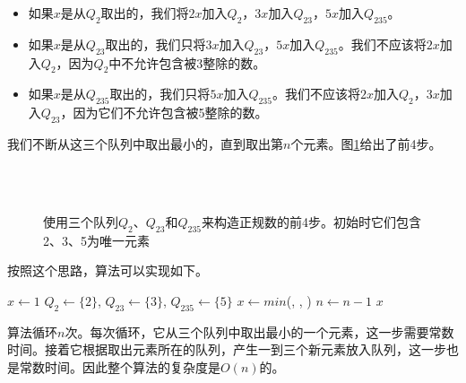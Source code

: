 \documentclass[b5paper]{ctexart}
\begin{document}
\begin{itemize}
\item 如果$x$是从$Q_2$取出的，我们将$2x$加入$Q_2$，$3x$加入$Q_{23}$，$5x$加入$Q_{235}$。
\item 如果$x$是从$Q_{23}$取出的，我们只将$3x$加入$Q_{23}$，$5x$加入$Q_{235}$。我们不应该将$2x$加入$Q_2$，因为$Q_2$中不允许包含被3整除的数。
\item 如果$x$是从$Q_{235}$取出的，我们只将$5x$加入$Q_{235}$。我们不应该将$2x$加入$Q_2$，$3x$加入$Q_{23}$，因为它们不允许包含被5整除的数。
\end{itemize}

我们不断从这三个队列中取出最小的，直到取出第$n$个元素。图\ref{fig:q235}给出了前4步。

\begin{figure}[htbp]
  \centering
   \\
   \\
  \caption{使用三个队列$Q_2$、$Q_{23}$和$Q_{235}$来构造正规数的前4步。初始时它们包含2、3、5为唯一元素}
  \label{fig:q235}
\end{figure}

按照这个思路，算法可以实现如下。

\begin{algorithmic}[1]
  \State $x \gets 1$
  \State $Q_2 \gets \{ 2 \}$, $Q_{23} \gets \{ 3 \}$, $Q_{235} \gets \{ 5 \}$
    \State $x \gets min$(, , )
      \State {}
      \State {}
      \State {}
      \State {}
      \State {}
      \State {}
      \State {}
    \Else
      \State {}
      \State {}
    \EndIf
    \State $n \gets n - 1$
  \EndWhile
  \State \Return $x$
\EndFunction
\end{algorithmic}

算法循环$n$次。每次循环，它从三个队列中取出最小的一个元素，这一步需要常数时间。接着它根据取出元素所在的队列，产生一到三个新元素放入队列，这一步也是常数时间。因此整个算法的复杂度是$O(n)$的。
\end{document}
